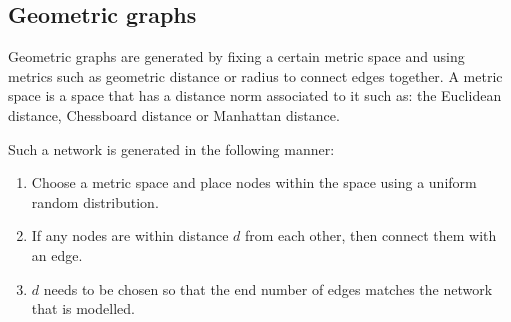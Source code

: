 \subsection{Geometric graphs}

Geometric graphs are generated by fixing a certain metric space and using
metrics such as geometric distance or radius to connect edges together. A
metric space is a space that has a distance norm associated to it such as: the
Euclidean distance, Chessboard distance or Manhattan distance.

Such a network is generated in the following manner:
\begin{enumerate}
 \item Choose a metric space and place nodes within the space using a uniform
random distribution.
 \item If any nodes are within distance $d$ from each other, then connect them
with an edge.
 \item $d$ needs to be chosen so that the end number of edges matches the network
that is modelled.
\end{enumerate}

